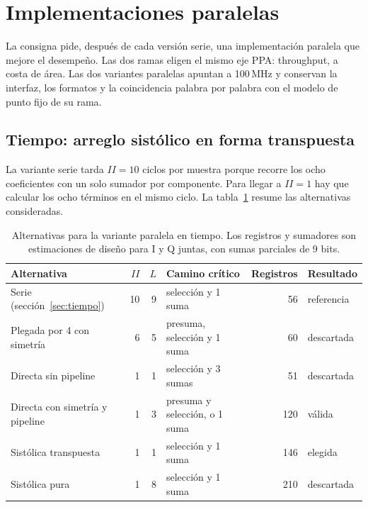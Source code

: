 \section{Implementaciones paralelas}\label{sec:paralelas}

La consigna pide, después de cada versión serie, una implementación paralela que mejore el desempeño. Las dos ramas eligen el mismo eje PPA: throughput, a costa de área. Las dos variantes paralelas apuntan a 100\,MHz y conservan la interfaz, los formatos y la coincidencia palabra por palabra con el modelo de punto fijo de su rama.

\subsection{Tiempo: arreglo sistólico en forma transpuesta}

La variante serie tarda $II = 10$ ciclos por muestra porque recorre los ocho coeficientes con un solo sumador por componente. Para llegar a $II = 1$ hay que calcular los ocho términos en el mismo ciclo. La tabla~\ref{tab:tiempo-alternativas} resume las alternativas consideradas.

\begin{table}[h]
  \centering
  \caption{Alternativas para la variante paralela en tiempo. Los registros y sumadores son estimaciones de diseño para I y Q juntas, con sumas parciales de 9 bits.}\label{tab:tiempo-alternativas}
  \small
  \begin{tabular}{lrrlrl}
    \toprule
    Alternativa & $II$ & $L$ & Camino crítico & Registros & Resultado \\
    \midrule
    Serie (sección~\ref{sec:tiempo}) & 10 & 9 & selección y 1 suma & 56 & referencia \\
    Plegada por 4 con simetría & 6 & 5 & presuma, selección y 1 suma & 60 & descartada \\
    Directa sin pipeline & 1 & 1 & selección y 3 sumas & 51 & descartada \\
    Directa con simetría y pipeline & 1 & 3 & presuma y selección, o 1 suma & 120 & válida \\
    Sistólica transpuesta & 1 & 1 & selección y 1 suma & 146 & elegida \\
    Sistólica pura & 1 & 8 & selección y 1 suma & 210 & descartada \\
    \bottomrule
  \end{tabular}
\end{table}


